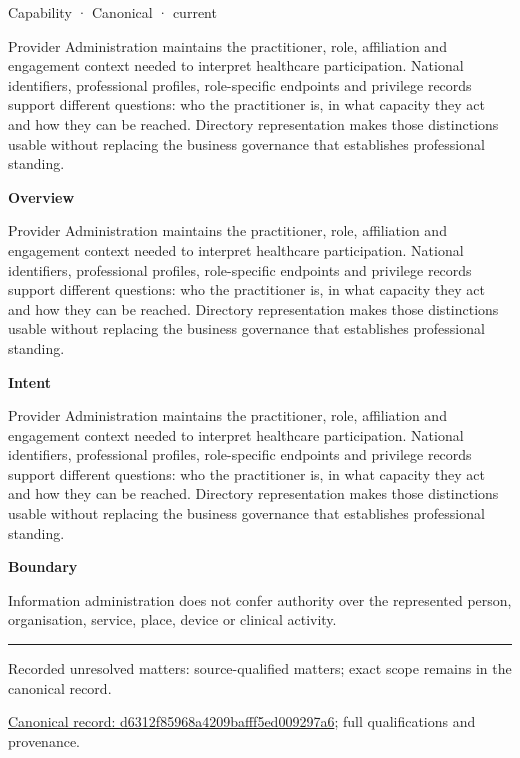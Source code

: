 \label{element:d6312f85968a4209bafff5ed009297a6}
{\small Capability · Canonical · current}\par

Provider Administration maintains the practitioner, role, affiliation and engagement context needed to interpret healthcare participation. National identifiers, professional profiles, role-specific endpoints and privilege records support different questions: who the practitioner is, in what capacity they act and how they can be reached. Directory representation makes those distinctions usable without replacing the business governance that establishes professional standing.



\textbf{Overview}



Provider Administration maintains the practitioner, role, affiliation and engagement context needed to interpret healthcare participation. National identifiers, professional profiles, role-specific endpoints and privilege records support different questions: who the practitioner is, in what capacity they act and how they can be reached. Directory representation makes those distinctions usable without replacing the business governance that establishes professional standing.



\textbf{Intent}



Provider Administration maintains the practitioner, role, affiliation and engagement context needed to interpret healthcare participation. National identifiers, professional profiles, role-specific endpoints and privilege records support different questions: who the practitioner is, in what capacity they act and how they can be reached. Directory representation makes those distinctions usable without replacing the business governance that establishes professional standing.



\textbf{Boundary}



Information administration does not confer authority over the represented person, organisation, service, place, device or clinical activity.



\medskip\hrule\medskip

{\small Recorded unresolved matters: source-qualified matters; exact scope remains in the canonical record.}\par
{\footnotesize \href{../../../../continuum/strategy/capability/d6312f85968a4209bafff5ed009297a6.md}{Canonical record: d6312f85968a4209bafff5ed009297a6}; full qualifications and provenance.}\par

